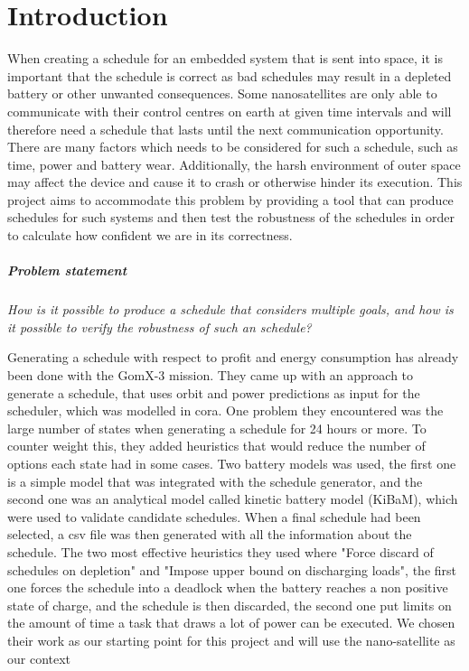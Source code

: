 \chapter{Introduction}\label{cha:intro}
When creating a schedule for an embedded system that is sent into space, it is important that the schedule is correct as bad schedules may result in a depleted battery or other unwanted consequences. 
Some nanosatellites are only able to communicate with their control centres on earth at given time intervals and will therefore need a schedule that lasts until the next communication opportunity.
There are many factors which needs to be considered for such a schedule, such as time, power and battery wear. 
Additionally, the harsh environment of outer space may affect the device and cause it to crash or otherwise hinder its execution. 
This project aims to accommodate this problem by providing a tool that can produce schedules for such systems and then test the robustness of the schedules in order to calculate how confident we are in its correctness.

\paragraph{Problem statement}
\textit{How is it possible to produce a schedule that considers multiple goals, and how is it possible to verify the robustness of such an schedule?}

Generating a schedule with respect to profit and energy consumption has already been done with the GomX-3 mission\cite{gomx3}. 
They came up with an approach to generate a schedule, that uses orbit and power predictions as input for the scheduler, which was modelled in \gls{cora}. 
One problem they encountered was the large number of states when generating a schedule for 24 hours or more. 
To counter weight this, they added heuristics that would reduce the number of options each state had in some cases. 
Two battery models was used, the first one is a simple model that was integrated with the schedule generator, and the second one was an analytical model called kinetic battery model (KiBaM), which were used to validate candidate schedules. 
When a final schedule had been selected, a csv file was then generated with all the information about the schedule. 
The two most effective heuristics they used where "Force discard of schedules on depletion" and "Impose upper bound on discharging loads", the first one forces the schedule into a deadlock when the battery reaches a non positive state of charge, and the schedule is then discarded, the second one put limits on the amount of time a task that draws a lot of power can be executed\cite{gomx3}. 
We chosen their work as our starting point for this project and will use the nano-satellite as our context

